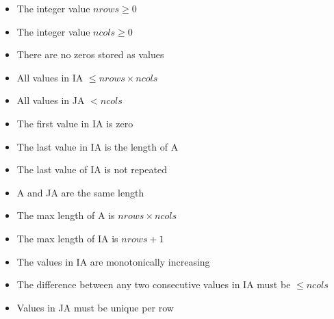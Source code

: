 \documentclass[11pt,conference]{IEEEtran}
\begin{document}
\begin{itemize}
  \item The integer value \(nrows \geq 0\)
  \item The integer value \(ncols \geq 0\)
	\item There are no zeros stored as values
	\item All values in IA \(\leq nrows \times ncols\)
	\item All values in JA \(< ncols\)
	\item The first value in IA is zero
	\item The last value in IA is the length of A
	\item The last value of IA is not repeated
	\item A and JA are the same length
	\item The max length of A is \(nrows \times ncols\)
	\item The max length of IA is \(nrows + 1\)
	\item The values in IA are monotonically increasing
	\item The difference between any two consecutive values in IA must be \(\leq ncols\)
	\item Values in JA must be unique per row
\end{itemize}



\end{document}
